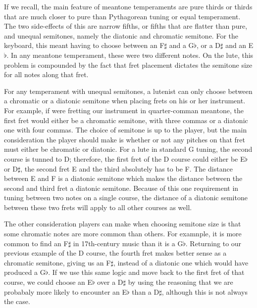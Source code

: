 If we recall, the main feature of meantone temperaments are pure thirds or thirds that are much
closer to pure than Pythagorean tuning or equal temperament.  The two side-effects of this
are narrow fifths, or fifths that are flatter than pure, and unequal semitones, namely the
diatonic and chromatic semitone.  For the keyboard, this meant having to choose between an
F$\sharp$ and a G$\flat$, or a D$\sharp$ and an E$\flat$.  In any meantone temperament, these were two
different notes.  On the lute, this problem is compounded by the fact that fret placement
dictates the semitone size for all notes along that fret.

For any temperament with unequal semitones, a lutenist can only choose
between a chromatic or a diatonic semitone when placing frets on his or her instrument.  For example,
if were fretting our instrument in quarter-comman meantone,
the first fret would either be a chromatic semitone, with three
commas or a diatonic one with four commas.  The choice of semitone is up to the player, but the
main consideration the player should make is whether or not any pitches on that fret must either
be chromatic or diatonic.  For a lute in standard G tuning, the second course is
tunned to D; therefore, the first fret of the D course could either be E$\flat$ or D$\sharp$, the second
fret E and the third absolutely has to be F.  The distance between E and
F is a diatonic semitone which makes the distance between the second and third fret a diatonic
semitone.  Because of this one requirement in tuning between two notes on a single course,
the distance of a diatonic semitone between these two frets will apply to all other courses as well.

The other consideration players can make when choosing semitone size is that some chromatic notes
are more common than others.  For examnple, it is more common to find an F$\sharp$ in 17th-century
music than it is a G$\flat$.  Returning to our previous example of the D course, the fourth fret
makes better sense as a chromatic semitone, giving us an F$\sharp$, instead of a diatonic one
which would have produced a G$\flat$.  If we use this same logic and move back to the first
fret of that course, we could choose an E$\flat$ over a D$\sharp$ by using the reasoning that
we are probabaly more likely to encounter an E$\flat$ than a D$\sharp$, although this is not always
the case.

